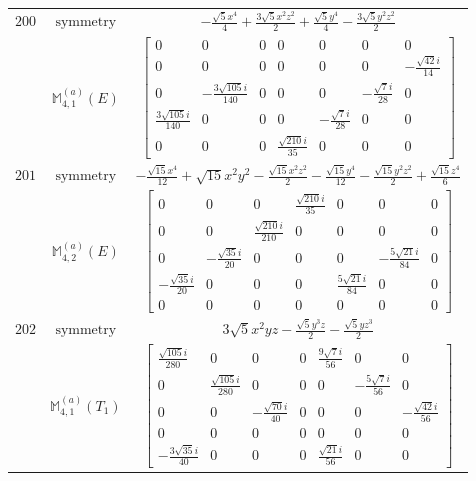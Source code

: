 \documentclass[fleqn,8pt,landscape]{jsarticle}
\begin{document}
\begin{longtable}{ccc}
$ 200 $ & $ \text{symmetry} $ & $ - \frac{\sqrt{5} x^{4}}{4} + \frac{3 \sqrt{5} x^{2} z^{2}}{2} + \frac{\sqrt{5} y^{4}}{4} - \frac{3 \sqrt{5} y^{2} z^{2}}{2} $ \\
$  $ & $ \mathbb{M}_{4,1}^{(a)}(E) $ & $ \begin{bmatrix} 0 & 0 & 0 & 0 & 0 & 0 & 0 \\ 0 & 0 & 0 & 0 & 0 & 0 & - \frac{\sqrt{42} i}{14} \\ 0 & - \frac{3 \sqrt{105} i}{140} & 0 & 0 & 0 & - \frac{\sqrt{7} i}{28} & 0 \\ \frac{3 \sqrt{105} i}{140} & 0 & 0 & 0 & - \frac{\sqrt{7} i}{28} & 0 & 0 \\ 0 & 0 & 0 & \frac{\sqrt{210} i}{35} & 0 & 0 & 0 \end{bmatrix} $ \\ \hline
$ 201 $ & $ \text{symmetry} $ & $ - \frac{\sqrt{15} x^{4}}{12} + \sqrt{15} x^{2} y^{2} - \frac{\sqrt{15} x^{2} z^{2}}{2} - \frac{\sqrt{15} y^{4}}{12} - \frac{\sqrt{15} y^{2} z^{2}}{2} + \frac{\sqrt{15} z^{4}}{6} $ \\
$  $ & $ \mathbb{M}_{4,2}^{(a)}(E) $ & $ \begin{bmatrix} 0 & 0 & 0 & \frac{\sqrt{210} i}{35} & 0 & 0 & 0 \\ 0 & 0 & \frac{\sqrt{210} i}{210} & 0 & 0 & 0 & 0 \\ 0 & - \frac{\sqrt{35} i}{20} & 0 & 0 & 0 & - \frac{5 \sqrt{21} i}{84} & 0 \\ - \frac{\sqrt{35} i}{20} & 0 & 0 & 0 & \frac{5 \sqrt{21} i}{84} & 0 & 0 \\ 0 & 0 & 0 & 0 & 0 & 0 & 0 \end{bmatrix} $ \\ \hline
$ 202 $ & $ \text{symmetry} $ & $ 3 \sqrt{5} x^{2} y z - \frac{\sqrt{5} y^{3} z}{2} - \frac{\sqrt{5} y z^{3}}{2} $ \\
$  $ & $ \mathbb{M}_{4,1}^{(a)}(T_{1}) $ & $ \begin{bmatrix} \frac{\sqrt{105} i}{280} & 0 & 0 & 0 & \frac{9 \sqrt{7} i}{56} & 0 & 0 \\ 0 & \frac{\sqrt{105} i}{280} & 0 & 0 & 0 & - \frac{5 \sqrt{7} i}{56} & 0 \\ 0 & 0 & - \frac{\sqrt{70} i}{40} & 0 & 0 & 0 & - \frac{\sqrt{42} i}{56} \\ 0 & 0 & 0 & 0 & 0 & 0 & 0 \\ - \frac{3 \sqrt{35} i}{40} & 0 & 0 & 0 & \frac{\sqrt{21} i}{56} & 0 & 0 \end{bmatrix} $ \\ \hline

\end{longtable}
\end{document}
